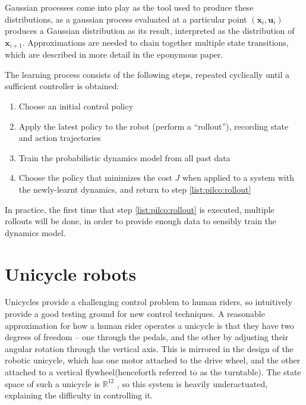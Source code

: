\documentclass[main.tex]{subfiles}
\begin{document}
	Gaussian processes come into play as the tool used to produce these distributions, as a gaussian process evaluated at a particular point $(\bm{x}_i,\bm{u}_i)$ produces a Gaussian distribution as its result, interpreted as the distribution of $\bm{x}_{i+1}$. Approximations are needed to chain together multiple state transitions, which are described in more detail in the eponymous paper\cite{pilco}.

	The learning process consists of the following steps, repeated cyclically until a sufficient controller is obtained:
	\begin{enumerate}[nosep]
		\item Choose an initial control policy
		\item Apply the latest policy to the robot (perform a \enquote{rollout}), recording state and action trajectories \label{list:pilco:rollout}
		\item Train the probabilistic dynamics model from all past data
		\item Choose the policy that minimizes the cost $J$ when applied to a system with the newly-learnt dynamics, and return to step \ref{list:pilco:rollout}
	\end{enumerate}
	In practice, the first time that step \ref{list:pilco:rollout} is executed, multiple rollouts will be done, in order to provide enough data to sensibly train the dynamics model.



\section{Unicycle robots}

	Unicycles provide a challenging control problem to human riders, so intuitively provide a good testing ground for new control techniques.
	A reasonable approximation for how a human rider operates a unicycle is that they have two degrees of freedom -- one through the pedals, and the other by adjusting their angular rotation through the vertical axis.
	This is mirrored in the design of the robotic unicycle, which has one motor attached to the drive wheel, and the other attached to a vertical flywheel\footnotemark (henceforth referred to as the turntable).
	The state space of such a unicycle is $\mathbb{R}^{12}$ \cite{forster}, so this system is heavily underactuated, explaining the difficulty in controlling it.

\end{document}
